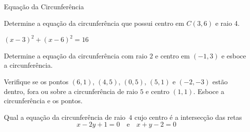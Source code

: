 
\begin{exercicios}{Equação da Circunferência}
    
    \begin{exercicio}
        Determine a equação da circunferência que possui centro em $C(3,6)$ e raio 4.
        \begin{answers}
            \tabto{2em} $(x-3)^2 + (x-6)^2 = 16$
        \end{answers}
    \end{exercicio}
    
    \begin{exercicio}
        Determine a equação da circunferência com raio $2$ e centro em $(-1,3)$ e esboce a circunferência.
    \end{exercicio}

    \begin{exercicio}
        Verifique se os pontos $(6,1)$, $(4,5)$, $(0,5)$, $(5,1)$ e $(-2,-3)$ estão dentro, 
        fora ou sobre a circunferência de raio $5$ e centro $(1,1)$. 
        Esboce a circunferência e os pontos.
    \end{exercicio}
        
    \begin{exercicio}
        Qual a equação da circunferência de raio~$4$ cujo centro é a intersecção das retas 
        \[x -2y +1 = 0 \quad \text{e} \quad x + y - 2 = 0\]
    \end{exercicio}
        

\end{exercicios}
